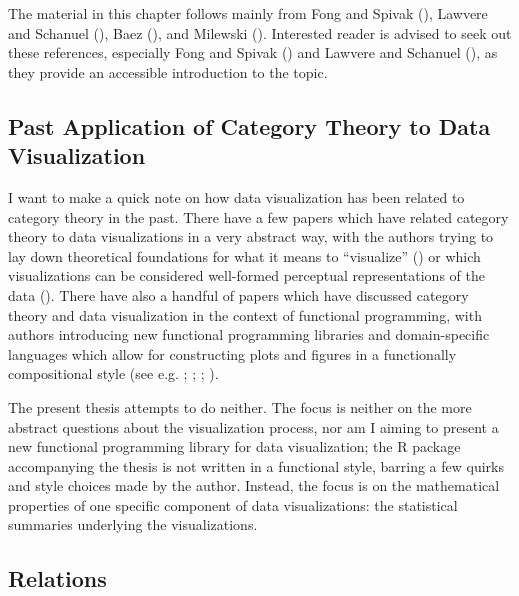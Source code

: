 \documentclass[
]{book}
\theoremstyle{definition}
\theoremstyle{definition}
\theoremstyle{definition}
\theoremstyle{definition}
\theoremstyle{remark}
\begin{document}
The material in this chapter follows mainly from Fong and Spivak (), Lawvere and Schanuel (), Baez (), and Milewski (). Interested reader is advised to seek out these references, especially Fong and Spivak () and Lawvere and Schanuel (), as they provide an accessible introduction to the topic.

\subsection{Past Application of Category Theory to Data Visualization}\label{past-application-of-category-theory-to-data-visualization}

I want to make a quick note on how data visualization has been related to category theory in the past. There have a few papers which have related category theory to data visualizations in a very abstract way, with the authors trying to lay down theoretical foundations for what it means to ``visualize'' () or which visualizations can be considered well-formed perceptual representations of the data (). There have also a handful of papers which have discussed category theory and data visualization in the context of functional programming, with authors introducing new functional programming libraries and domain-specific languages which allow for constructing plots and figures in a functionally compositional style (see e.g. ; ; ; ).

The present thesis attempts to do neither. The focus is neither on the more abstract questions about the visualization process, nor am I aiming to present a new functional programming library for data visualization; the R package accompanying the thesis is not written in a functional style, barring a few quirks and style choices made by the author. Instead, the focus is on the mathematical properties of one specific component of data visualizations: the statistical summaries underlying the visualizations.

\subsection{Relations}\label{relations}
\end{document}
